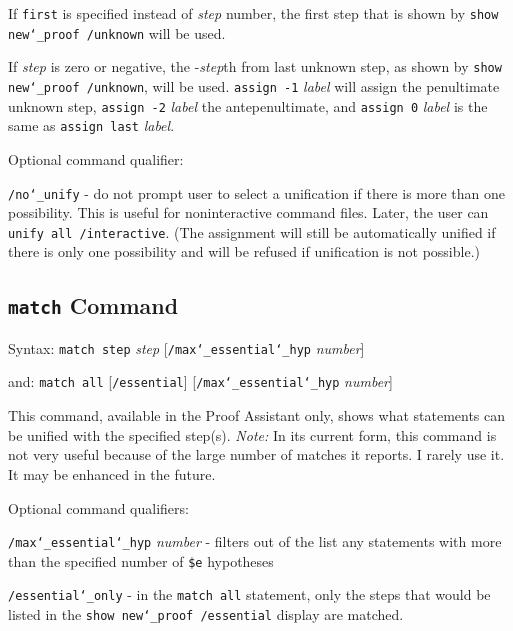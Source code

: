 If \texttt{first} is specified instead of {\em step} number, the first
step that is shown by \texttt{show new{\char`\_}proof /unknown} will be
used.

If {\em step} is zero or negative, the -{\em step}th from last unknown
step, as shown by \texttt{show new{\char`\_}proof /unknown}, will be
used.  \texttt{assign -1} {\em label} will assign the penultimate
unknown step, \texttt{assign -2} {\em label} the antepenultimate, and
\texttt{assign 0} {\em label} is the same as \texttt{assign last} {\em
label}.

Optional command qualifier:

    \texttt{/no{\char`\_}unify} - do not prompt user to select a unification if there is
        more than one possibility.  This is useful for noninteractive
        command files.  Later, the user can \texttt{unify all /interactive}.
        (The assignment will still be automatically unified if there is only
        one possibility and will be refused if unification is not possible.)



\subsection{\texttt{match} Command}
Syntax:  \texttt{match step} {\em step} [\texttt{/max{\char`\_}essential{\char`\_}hyp}
{\em number}]

    and:  \texttt{match all} [\texttt{/essential}]
          [\texttt{/max{\char`\_}essential{\char`\_}hyp} {\em number}]

This command, available in the Proof Assistant only, shows what
statements can be unified with the specified step(s).  {\em Note:} In
its current form, this command is not very useful because of the large
number of matches it reports.  I rarely use it.
It may be enhanced in the future.

Optional command qualifiers:

    \texttt{/max{\char`\_}essential{\char`\_}hyp} {\em number} - filters out
        of the list any statements
        with more than the specified number of
        \texttt{\$e} hypotheses

    \texttt{/essential{\char`\_}only} - in the \texttt{match all} statement, only
        the steps that
        would be listed in the \texttt{show new{\char`\_}proof /essential} display are
        matched.



